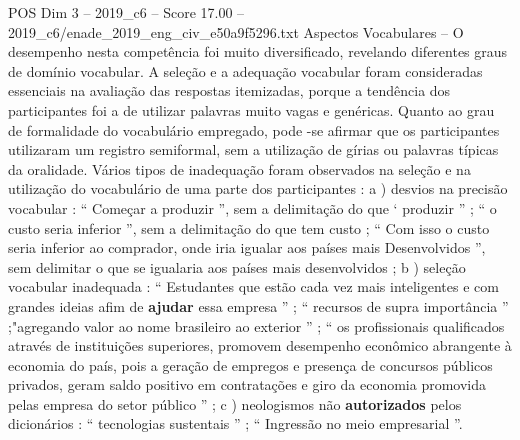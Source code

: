 \begin{textsample}{POS Dim 3 – 2019\_c6 – Score 17.00 – 2019\_c6/enade\_2019\_eng\_civ\_e50a9f5296.txt}
Aspectos Vocabulares – O desempenho nesta competência foi muito diversificado, revelando diferentes graus de domínio vocabular.
A seleção e a adequação vocabular foram consideradas essenciais na avaliação das respostas itemizadas, porque a tendência dos participantes foi a de utilizar palavras muito vagas e genéricas.
Quanto ao grau de formalidade do vocabulário empregado, pode -se afirmar que os participantes utilizaram um registro semiformal, sem a utilização de gírias ou palavras típicas da oralidade.
Vários tipos de inadequação foram observados na seleção e na utilização do vocabulário de uma parte dos participantes : a ) desvios na precisão vocabular : “ Começar a produzir ”, sem a delimitação do que ‘ produzir ” ; “ o custo seria inferior ”, sem a delimitação do que tem custo ; “ Com isso o custo seria inferior ao comprador, onde iria igualar aos países mais Desenvolvidos ”, sem delimitar o que se igualaria aos países mais desenvolvidos ; b ) seleção vocabular inadequada : “ Estudantes que estão cada vez mais inteligentes e com grandes ideias afim de \textbf{ajudar} essa empresa ” ; “ recursos de supra importância ” ;"agregando valor ao nome brasileiro ao exterior ” ; “ os profissionais qualificados através de instituições superiores, promovem desempenho econômico abrangente à economia do país, pois a geração de empregos e presença de concursos públicos privados, geram saldo positivo em contratações e giro da economia promovida pelas empresa do setor público ” ; c ) neologismos não \textbf{autorizados} pelos dicionários : “ tecnologias sustentais ” ; “ Ingressão no meio empresarial ”.

\end{textsample}
